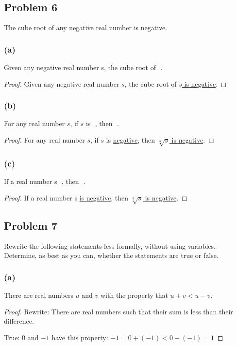 \documentclass[14pt]{extarticle}
\newcommand{\fbl}{\underline{\hspace{1cm}}\,\,}
\begin{document}
\subsection{Problem 6}
The cube root of any negative real number is negative.

\subsubsection{(a)}
Given any negative real number s, the cube root of \fbl.

\begin{proof}
    Given any negative real number $s$, the cube root of
    \underline{$s$ is negative}.
\end{proof}

\subsubsection{(b)}
For any real number $s$, if $s$ is \fbl, then \fbl.

\begin{proof}
    For any real number $s$, if $s$ is \underline{negative}, then
    \underline{$\sqrt[3]{s}$ is negative}.
\end{proof}

\subsubsection{(c)}
If a real number s \fbl, then \fbl.

\begin{proof}
    If a real number s \underline{is negative}, then \underline{$\sqrt[3]{s}$ is
        negative}.
\end{proof}

\subsection{Problem 7}
Rewrite the following statements less formally, without using variables.
Determine, as best as you can, whether the statements are true or false.

\subsubsection{(a)}
There are real numbers $u$ and $v$ with the property that $u + v < u - v$.

\begin{proof}
    Rewrite: There are real numbers such that their sum is less than their
    difference.

    True: $0$ and $-1$ have this property: $-1 = 0 + (-1) < 0 - (-1) = 1$
\end{proof}
\end{document}
